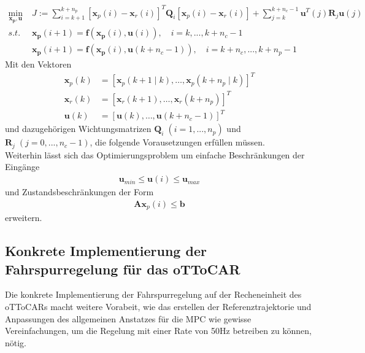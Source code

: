 \begin{align*}
	\underset{\boldsymbol{x_p, u}}{\text{min}}\;&J:=\sum_{i=k+1}^{k+n_p} \left [\boldsymbol{x}_{p}(i)-\boldsymbol{x}_{r}(i)\right ]^T\boldsymbol{Q}_i\left [\boldsymbol{x}_{p}(i)-\boldsymbol{x}_{r}(i)\right ] +\sum_{j=k}^{k+n_c-1} \boldsymbol{u}^T(j)\boldsymbol{R}_j\boldsymbol{u}(j)\\
	s.t.\;&\boldsymbol{x_p}(i+1)=\boldsymbol{f}\left ( \boldsymbol{x_p}(i), \boldsymbol{u}(i) \right ),\quad i=k,...,k+n_c-1\\
	&\boldsymbol{x_p}(i+1)=\boldsymbol{f}\left ( \boldsymbol{x_p}(i), \boldsymbol{u}(k+n_c-1) \right ),\quad i=k+n_c,...,k+n_p-1
\end{align*}
Mit den Vektoren
\begin{align*}
	\boldsymbol{x}_p(k)&=\left [ \boldsymbol{x}_p(k+1\mid k),\dots,\boldsymbol{x}_p(k+n_p\mid k) \right ]^T\\
	\boldsymbol{x}_r(k)&=\left [ \boldsymbol{x}_r(k+1),\dots,\boldsymbol{x}_r(k+n_p) \right ]^T\\
	\boldsymbol{u}(k)&=\left [ \boldsymbol{u}(k),\dots,\boldsymbol{u}(k+n_c-1) \right ]^T
\end{align*}
und dazugehörigen Wichtungsmatrizen $\boldsymbol{Q}_i\;(i=1, ...,n_p)$ und $\boldsymbol{R}_j\;(j=0, ...,n_c-1)$, die folgende Vorausetzungen erfüllen müssen.\\
Weiterhin lässt sich das Optimierungsproblem um einfache Beschränkungen der Eingänge
\begin{align*}
  \boldsymbol{u}_{min} \leq \boldsymbol{u}(i) \leq \boldsymbol{u}_{max}
\end{align*}
und Zustandsbeschränkungen der Form
\begin{align*}
  \boldsymbol{A}\boldsymbol{x}_p(i) \leq \boldsymbol{b}
\end{align*}
erweitern.

\subsection{Konkrete Implementierung der Fahrspurregelung für das oTToCAR}
Die konkrete Implementierung der Fahrspurregelung auf der Recheneinheit des oTToCARs macht weitere Vorabeit, wie das erstellen der Referenztrajektorie und Anpassungen des allgemeinen Anstatzes für die MPC wie gewisse Vereinfachungen, um die Regelung mit einer Rate von 50Hz betreiben zu können, nötig.
